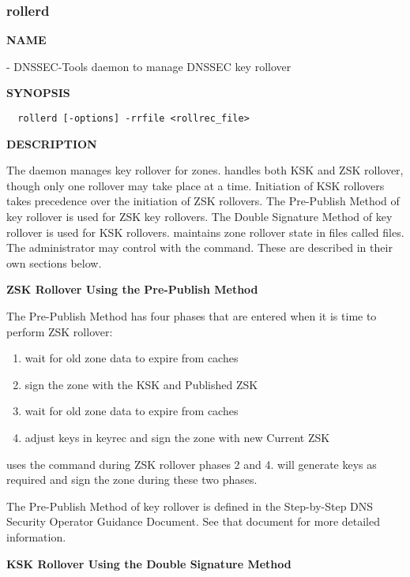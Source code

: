 \clearpage

\subsubsection{rollerd}

{\bf NAME}

 - DNSSEC-Tools daemon to manage DNSSEC key rollover

{\bf SYNOPSIS}

\begin{verbatim}
  rollerd [-options] -rrfile <rollrec_file>
\end{verbatim}

{\bf DESCRIPTION}

The  daemon manages key rollover for zones.   handles
both KSK and ZSK rollover, though only one rollover may take place at a time.
Initiation of KSK rollovers takes precedence over the initiation of ZSK
rollovers.  The Pre-Publish Method of key rollover is used for ZSK key
rollovers.  The Double Signature Method of key rollover is used for KSK
rollovers.   maintains zone rollover state in files called
 files.  The administrator may control  with the
 command.  These are described in their own sections below.

{\bf ZSK Rollover Using the Pre-Publish Method}

The Pre-Publish Method has four phases that are entered when it is time to
perform ZSK rollover:

\begin{enumerate}
\item wait for old zone data to expire from caches
\item sign the zone with the KSK and Published ZSK
\item wait for old zone data to expire from caches
\item adjust keys in keyrec and sign the zone with new Current ZSK
\end{enumerate}

 uses the  command during ZSK rollover phases 2
and 4.   will generate keys as required and sign the zone
during these two phases.

The Pre-Publish Method of key rollover is defined in the Step-by-Step DNS
Security Operator Guidance Document.  See that document for more detailed
information.

{\bf KSK Rollover Using the Double Signature Method}


